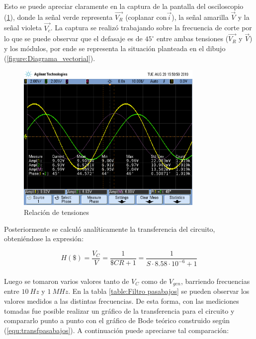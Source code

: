 \documentclass[11pt, a4paper]{article}
\begin{document}
Esto se puede apreciar claramente en la captura de la pantalla del osciloscopio ({\ref{figure:VrvsVs}}), donde la señal verde representa $\overrightarrow{V_R}$ (coplanar con$\overrightarrow{i}$), la señal amarilla $\overrightarrow{V}$ y la señal violeta $\overrightarrow{V_c}$. La captura se realizó trabajando sobre la frecuencia de corte por lo que se puede observar que el defasaje es de $45^\circ$ entre ambas tensiones ($\overrightarrow{V_R}$ y $\overrightarrow{V}$) y los módulos, por ende se representa la situación planteada en el dibujo ({\ref{figure:Diagrama_vectorial}}).

 \begin{figure}[H]
	\centering
	\includegraphics[width=0.8\textwidth,trim={0.7cm 6.25cm  0 3.5cm},clip]{VrvsVvsVc.png}
	\caption{Relación de tensiones}
	\label{figure:VrvsVs}
\end{figure}


\par

Posteriormente se calculó analíticamente la transferencia del circuito, obteniéndose la expresión:

\begin{equation}
	H \left(\$ \right) = \frac{V_C}{V} = \frac{1}{\$CR + 1} = \frac{1}{S \cdot 8.58 \cdot 10^{-6} + 1}
	\label{equ:transfpasabajos}
\end{equation} \\

Luego se tomaron varios valores tanto de $V_C$ como de $V_{gen}$, barriendo frecuencias entre $ 10 \ Hz $ y $ 1 \ MHz $. En la tabla \ref{table:Filtro pasabajos} se pueden observar los valores medidos a las distintas frecuencias. De esta forma, con las mediciones tomadas fue posible realizar un gráfico de la transferencia para el circuito y compararlo punto a punto con el gráfico de Bode teórico construido según (\ref{equ:transfpasabajos}). A continuación puede apreciarse tal comparación:
\end{document}
